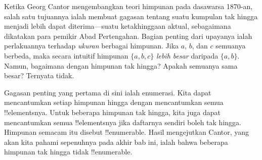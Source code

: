 \documentclass[../../../include/open-logic-section]{subfiles}
\begin{document}


Ketika Georg Cantor mengembangkan teori himpunan pada dasawarsa 1870-an,
salah satu tujuannya ialah membuat gagasan tentang suatu kumpulan tak hingga
menjadi lebih dapat diterima---suatu ketakhinggaan aktual, sebagaimana
dikatakan para pemikir Abad Pertengahan. Bagian penting dari upayanya ialah
perlakuannya terhadap \emph{ukuran} berbagai himpunan. Jika $a$, $b$, dan $c$
semuanya berbeda, maka secara intuitif himpunan $\{a, b, c\}$ \emph{lebih
besar} daripada $\{a, b\}$. Namun, bagaimana dengan himpunan tak hingga?
Apakah semuanya sama besar? Ternyata tidak.

Gagasan penting yang pertama di sini ialah enumerasi. Kita dapat
mencantumkan setiap himpunan hingga dengan mencantumkan semua !!{element}snya.
Untuk beberapa himpunan tak hingga, kita juga dapat mencantumkan semua
!!{element}snya jika daftarnya sendiri boleh tak hingga. Himpunan semacam itu
disebut !!{enumerable}. Hasil mengejutkan Cantor, yang akan kita pahami
sepenuhnya pada akhir bab ini, ialah bahwa beberapa himpunan tak hingga tidak
!!{enumerable}.
\end{document}
